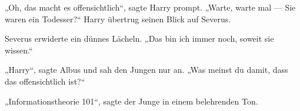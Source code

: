 „Oh, das macht es offensichtlich“, sagte Harry prompt.
„Warte, warte mal — Sie waren ein Todesser?“ Harry übertrug seinen Blick auf Severus.

Severus erwiderte ein dünnes Lächeln.
„Das bin ich immer noch, soweit sie wissen.“

„Harry“, sagte Albus und sah den Jungen nur an.
„Was meinst du damit, dass das offensichtlich ist?“

„Informationstheorie 101“, sagte der Junge in einem belehrenden Ton.

